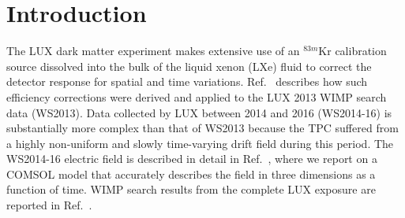 \section{Introduction}\label{section:Intro}





The LUX dark matter experiment makes extensive use of an $^{83m}$Kr 
calibration source dissolved into the bulk of the liquid xenon (LXe) fluid
to correct the detector response for spatial and time variations.
Ref.~\cite{scottspaper} describes how such efficiency corrections were 
derived and applied to the LUX 2013 WIMP search data (WS2013). 
Data collected by LUX between 2014 and 2016 (WS2014-16) is substantially 
more complex than that of WS2013 because the TPC suffered from a highly non-uniform and slowly time-varying 
drift field during this period. The WS2014-16 electric field is described in detail in Ref.~\cite{luciespaper},
where we report on a COMSOL model that accurately describes the field 
in three dimensions as a function of time. WIMP search results from the complete
LUX exposure are reported in Ref.~\cite{lux-complete}.


